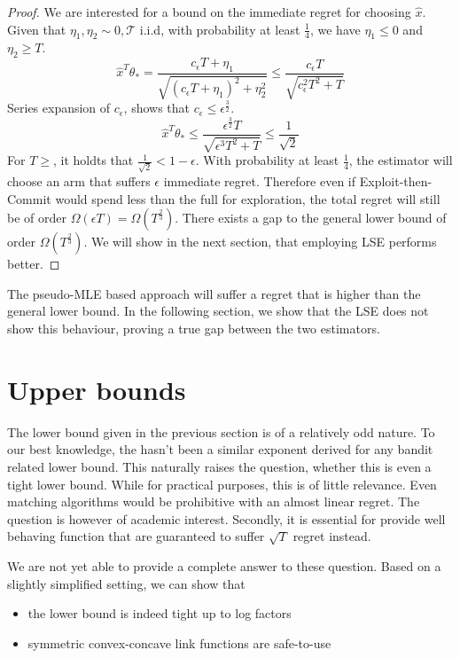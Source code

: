 \documentclass[twoside]{article} \usepackage{aistats2017}
\begin{document}
\begin{proof}
    We are interested for a bound on the immediate regret for choosing $\hat{x}$. Given that $\eta_1,\eta_2\sim \mathcal{0,T}$ i.i.d, with probability at least $\frac{1}{4}$, we have $\eta_1\leq0$ and $\eta_2 \geq T$.
    $$
    \hat{x}^T\theta_* = \frac{c_\epsilon T+\eta_1}{\sqrt{(c_\epsilon T+\eta_1)^2+\eta_2^2}}\leq \frac{c_\epsilon T}{\sqrt{c^2_\epsilon T^2 + T}}
    $$
    Series expansion of $c_\epsilon$, shows that $c_\epsilon\leq\epsilon^{\frac{3}{2}}$.
    $$
    \hat{x}^T\theta_*\leq \frac{\epsilon^{\frac{3}{2}}T}{\sqrt{\epsilon^3T^2+T}}\leq \frac{1}{\sqrt{2}}
    $$
    For $T\geq $, it holdts that $\frac{1}{\sqrt{2}}<1-\epsilon$. With probability at least $\frac{1}{4}$, the estimator will  choose an arm that suffers $\epsilon$ immediate regret. Therefore even if Exploit-then-Commit would spend less than the full for exploration, the total regret will still be of order $\Omega(\epsilon T)=\Omega (T^{\frac{2}{3}})$. There exists a gap to the general lower bound of order $\Omega (T^{\frac{2}{3}})$. We will show in the next section, that employing LSE performs better.
    
    
    
    
\end{proof}

The pseudo-MLE based approach will suffer a regret that is higher than the general lower bound. In the following section, we show that the LSE does not show this behaviour, proving a true gap between the two estimators.
\section{Upper bounds}\label{upperBounds}
The lower bound given in the previous section is of a relatively odd nature. 
To our best knowledge, the hasn't been a similar exponent derived for any bandit related lower bound.
This naturally raises the question, whether this is even a tight lower bound.
While for practical purposes, this is of little relevance. Even matching algorithms would be prohibitive with an almost linear regret. The question is however of academic interest.
Secondly, it is essential for provide well behaving function that are guaranteed to suffer $\sqrt{T}$ regret instead.

We are not yet able to provide a complete answer to these question. 
Based on a slightly simplified setting, we can show that
\begin{itemize}
\item the lower bound is indeed tight up to log factors
\item symmetric convex-concave link functions are safe-to-use
\end{itemize}
\end{document}

